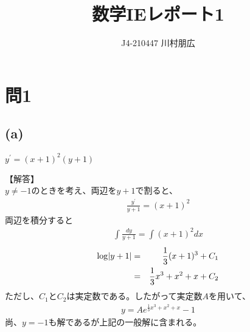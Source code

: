 \documentclass[pdflatex,ja=standard,fleqn]{bxjsarticle}
\title{数学IEレポート1}
\author{J4-210447 川村朋広}
\begin{document}
\maketitle
\section*{問1}
\subsection*{(a)}
\begin{screen}
    $y^{\prime}=(x+1)^2(y+1)$ 
\end{screen}
【解答】\\
$y\neq-1$のときを考え、両辺を$y+1$で割ると、
\begin{eqnarray*}\frac{y^{\prime}}{y+1}=(x+1)^2\end{eqnarray*}
両辺を積分すると
\begin{eqnarray*}\int \frac{dy}{y+1}=\int (x+1)^2dx\end{eqnarray*}
\begin{eqnarray*}{\rm log}|y+1|
    &=&\frac{1}{3}(x+1)^3+C_{1}\\
    &=&\frac{1}{3}x^3+x^2+x+C_{2}
\end{eqnarray*}
ただし、$C_{1}$と$C_{2}$は実定数である。したがって実定数$A$を用いて、
\begin{eqnarray*}y = Ae^{\frac{1}{3}x^3+x^2+x}-1\end{eqnarray*}
尚、$y=-1$も解であるが上記の一般解に含まれる。
\end{document}
